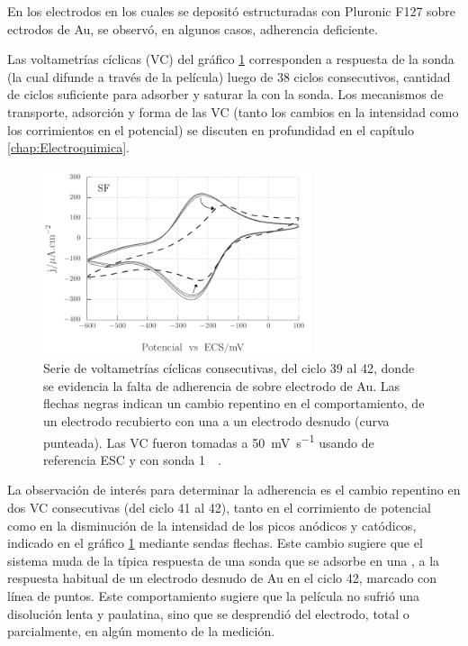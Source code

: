 			En los electrodos en los cuales se depositó \pdm\space estructuradas con Pluronic F127 sobre ectrodos de Au, se observó, en algunos casos, adherencia deficiente. 
			
			Las voltametrías cíclicas (VC) del gráfico \ref{fig:adherencia_F127} corresponden a respuesta de la sonda \aminorutenio (la cual difunde a través de la película) luego de 38 ciclos consecutivos, cantidad de ciclos suficiente para adsorber y saturar la \pdm\space con la sonda. Los mecanismos de transporte, adsorción y forma de las VC (tanto los cambios en la intensidad como los corrimientos en el potencial) se discuten en profundidad en el capítulo \ref{chap:Electroquimica}. 
			
				\begin{figure}[bh!]
				 	   	    \begin{center} 
				        	\includegraphics[width=0.70\textwidth]{Graficos/Adherencia_F127.pdf}
				       		\caption[Adherencia de \pdmF \space sobre una película delgada de Au.]{Serie de voltametrías cíclicas consecutivas, del ciclo 39 al 42, donde se evidencia la falta de adherencia de \pdmF\space sobre electrodo de Au. Las flechas negras indican un cambio repentino en el comportamiento, de un electrodo recubierto con una \pdm\space a un electrodo desnudo (curva punteada). Las VC fueron tomadas a \SI{50}{\milli\volt.\second^{-1}} usando de referencia ESC y con sonda \ru\space \SI{1}{\milli\Molar}.}
				         	\label{fig:adherencia_F127}
				     		\end{center}
				     		\end{figure}

			La observación de interés para determinar la adherencia es el cambio repentino en dos VC consecutivas (del ciclo 41 al 42), tanto en el corrimiento de potencial como en la disminución de la intensidad de los picos anódicos y catódicos, indicado en el gráfico \ref{fig:adherencia_F127} mediante sendas flechas. Este cambio sugiere que el sistema muda de la típica respuesta de una sonda que se adsorbe en una \pdm, a la respuesta habitual de un electrodo desnudo de Au en el ciclo 42, marcado con línea de puntos. Este comportamiento sugiere que la película no sufrió una disolución lenta y paulatina, sino que se desprendió del electrodo, total o parcialmente, en algún momento de la medición.	     		

